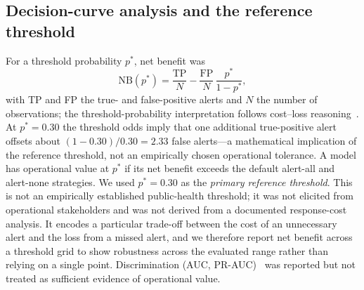\documentclass[11pt,a4paper]{article}
\begin{document}
\subsection{Decision-curve analysis and the reference threshold}
For a threshold probability $p^*$, net benefit was
\[
\mathrm{NB}(p^*)=\frac{\mathrm{TP}}{N}-\frac{\mathrm{FP}}{N}\,\frac{p^*}{1-p^*},
\]
with TP and FP the true- and false-positive alerts and $N$ the number of observations; the threshold-probability interpretation follows cost--loss reasoning~\cite{Vickers2006,Murphy1985,Tozan2023}. At $p^*=0.30$ the threshold odds imply that one additional true-positive alert offsets about $(1-0.30)/0.30=2.33$ false alerts---a mathematical implication of the reference threshold, not an empirically chosen operational tolerance. A model has operational value at $p^*$ if its net benefit exceeds the default alert-all and alert-none strategies. We used $p^*=0.30$ as the \emph{primary reference threshold}. This is not an empirically established public-health threshold; it was not elicited from operational stakeholders and was not derived from a documented response-cost analysis. It encodes a particular trade-off between the cost of an unnecessary alert and the loss from a missed alert, and we therefore report net benefit across a threshold grid to show robustness across the evaluated range rather than relying on a single point. Discrimination (AUC, PR-AUC)~\cite{SaitoRehmsmeier2015} was reported but not treated as sufficient evidence of operational value.
\end{document}
